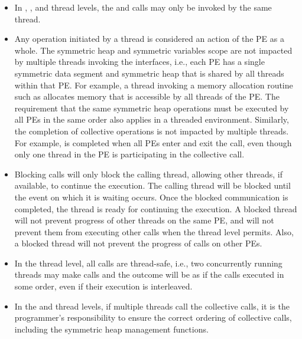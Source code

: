 \begin{itemize}
\item
In , , and 
 thread levels, the  and 
 calls may only be invoked by the same thread.

\item
Any \openshmem operation initiated by a thread is considered an action of the 
\ac{PE} as a whole. The symmetric heap and symmetric variables scope are not 
impacted by multiple threads invoking the \openshmem interfaces, i.e., 
each \ac{PE} has a single symmetric data segment and symmetric heap that is shared by
all threads within that \ac{PE}.  For example, a thread invoking a memory allocation
routine such as  allocates memory that is accessible by 
all threads of the \ac{PE}. The requirement that the same symmetric heap operations 
must be executed by all \acp{PE} in the same order also applies in a threaded
environment. Similarly, the completion of collective operations is not impacted 
by multiple threads. For example,  is completed when 
all \acp{PE} enter and exit the  call, even though 
only one thread in the \ac{PE} is participating in the collective call. 


\item Blocking \openshmem calls will only block the calling thread, allowing
other threads, if available, to continue the execution. The calling thread will 
be blocked until the event on which it is waiting occurs. Once the blocked communication is
completed, the thread is ready for continuing the execution. A blocked thread
will not prevent progress of other threads on the same \ac{PE}, and will not
prevent them from executing other \openshmem calls when the thread level permits. 
Also, a blocked thread will not prevent the progress of \openshmem calls on other \acp{PE}. 

\item In the  thread level, all \openshmem calls are thread-safe, 
i.e., two concurrently running threads may make \openshmem calls and the outcome 
will be as if the calls executed in some order, even if their execution is interleaved.

\item In the  and  thread levels, 
if multiple threads call the collective calls, it is the programmer's responsibility 
to ensure the correct ordering of collective calls, including the symmetric 
heap management functions.

\end{itemize} 
